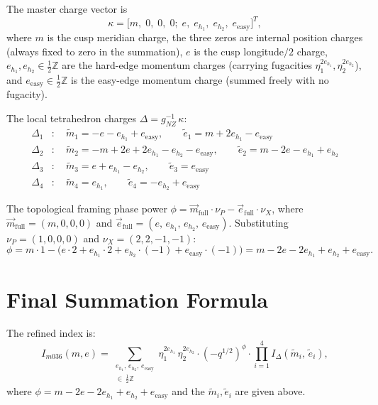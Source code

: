 \documentclass[12pt]{article}
\begin{document}
The master charge vector is
\[
\kappa = \bigl[m,\; 0,\; 0,\; 0;\; e,\; e_{h_1},\; e_{h_2},\; e_{\mathrm{easy}}\bigr]^T,
\]
where $m$ is the cusp meridian charge, the three zeros are internal position charges
(always fixed to zero in the summation), $e$ is the cusp longitude$/2$ charge,
$e_{h_1}, e_{h_2} \in \tfrac{1}{2}\mathbb{Z}$ are the hard-edge momentum charges
(carrying fugacities $\eta_1^{2e_{h_1}}, \eta_2^{2e_{h_2}}$),
and $e_{\mathrm{easy}} \in \tfrac{1}{2}\mathbb{Z}$ is the easy-edge momentum charge
(summed freely with no fugacity).

The local tetrahedron charges $\Delta = g_{NZ}^{-1}\,\kappa$:
\begin{align*}
\Delta_1 &: \quad
  \tilde{m}_1 = -e - e_{h_1} + e_{\mathrm{easy}},
  \qquad
  \tilde{e}_1 = m + 2e_{h_1} - e_{\mathrm{easy}} \\[4pt]
\Delta_2 &: \quad
  \tilde{m}_2 = -m + 2e + 2e_{h_1} - e_{h_2} - e_{\mathrm{easy}},
  \qquad
  \tilde{e}_2 = m - 2e - e_{h_1} + e_{h_2} \\[4pt]
\Delta_3 &: \quad
  \tilde{m}_3 = e + e_{h_1} - e_{h_2},
  \qquad
  \tilde{e}_3 = e_{\mathrm{easy}} \\[4pt]
\Delta_4 &: \quad
  \tilde{m}_4 = e_{h_1},
  \qquad
  \tilde{e}_4 = -e_{h_2} + e_{\mathrm{easy}}
\end{align*}

The topological framing phase power
$\phi = \vec{m}_{\mathrm{full}} \cdot \nu_P - \vec{e}_{\mathrm{full}} \cdot \nu_X$,
where $\vec{m}_{\mathrm{full}} = (m, 0, 0, 0)$ and
$\vec{e}_{\mathrm{full}} = (e,\, e_{h_1},\, e_{h_2},\, e_{\mathrm{easy}})$.
Substituting $\nu_P = (1,0,0,0)$ and $\nu_X = (2,2,-1,-1)$:
\[
\phi
= m \cdot 1 - \bigl(e \cdot 2 + e_{h_1} \cdot 2 + e_{h_2} \cdot (-1)
  + e_{\mathrm{easy}} \cdot (-1)\bigr)
= m - 2e - 2e_{h_1} + e_{h_2} + e_{\mathrm{easy}}.
\]

\section{Final Summation Formula}
The refined index is:
\[
I_{m036}(m, e)
= \sum_{\substack{e_{h_1},\, e_{h_2},\, e_{\mathrm{easy}} \\ \in\, \frac{1}{2}\mathbb{Z}}}
   \eta_1^{2e_{h_1}}\,\eta_2^{2e_{h_2}}
   \cdot (-q^{1/2})^{\phi}
   \cdot \prod_{i=1}^{4} I_{\Delta}(\tilde{m}_i,\, \tilde{e}_i),
\]
where $\phi = m - 2e - 2e_{h_1} + e_{h_2} + e_{\mathrm{easy}}$
and the $\tilde{m}_i, \tilde{e}_i$ are given above.
\end{document}

